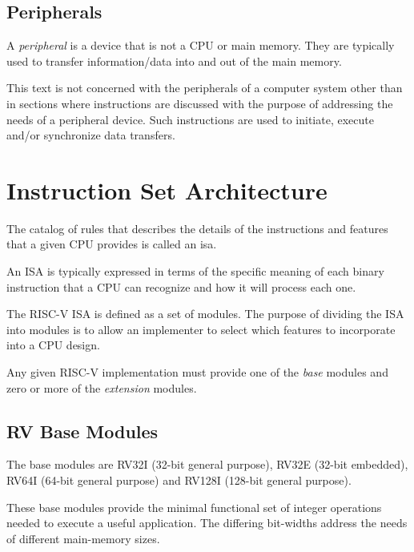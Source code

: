 \subsection{Peripherals}

A {\em peripheral} is a device that is not a CPU or main memory.  They are 
typically used to transfer information/data into and out of the 
main memory.

This text is not concerned with the peripherals of a computer
system other than in sections where instructions are discussed with the
purpose of addressing the needs of a peripheral device.  Such
instructions are used to initiate, execute and/or synchronize data transfers.


\section{Instruction Set Architecture}

The catalog of rules that describes the details of the instructions 
and features that a given CPU provides is called an \acrfull{isa}.

An ISA is typically expressed in terms of the specific meaning of
each binary instruction that a CPU can recognize and how it will
process each one.

The RISC-V ISA is defined as a set of modules.  The purpose of
dividing the ISA into modules is to allow an implementer to select which 
features to incorporate into a CPU design.\cite[p.~4]{rvismv1v22:2017}

Any given RISC-V implementation must provide one of the {\em base}
modules and zero or more of the {\em extension} modules.\cite[p.~4]{rvismv1v22:2017}

\subsection{RV Base Modules}

The base modules are RV32I (32-bit general purpose), 
RV32E (32-bit embedded), RV64I (64-bit general purpose) 
and RV128I (128-bit general purpose).\cite[p.~4]{rvismv1v22:2017}

These base modules provide the minimal functional set of integer operations
needed to execute a useful application.  The differing bit-widths address
the needs of different main-memory sizes.

